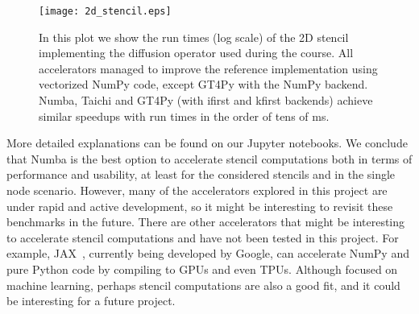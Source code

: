 \documentclass[12pt]{article}
\begin{document}
\begin{figure}[H]
    \centering
    \texttt{[image: 2d\_stencil.eps]}
    \caption{In this plot we show the run times (log scale) of the 2D stencil implementing the diffusion operator used during the course. All accelerators managed to improve the reference implementation using vectorized NumPy code, except GT4Py with the NumPy backend. Numba, Taichi and GT4Py (with ifirst and kfirst backends) achieve similar speedups with run times in the order of tens of ms.}
    \label{fig:stencil_2D}
\end{figure}

More detailed explanations can be found on our Jupyter notebooks. We conclude that Numba is the best option to accelerate stencil computations both in terms of performance and usability, at least for the considered stencils and in the single node scenario. However, many of the accelerators explored in this project are under rapid and active development, so it might be interesting to revisit these benchmarks in the future. There are other accelerators that might be interesting to accelerate stencil computations and have not been tested in this project. For example, JAX~\cite{Jax}, currently being developed by Google, can accelerate NumPy and pure Python code by compiling to GPUs and even TPUs. Although focused on machine learning, perhaps stencil computations are also a good fit, and it could be interesting for a future project.
\end{document}

